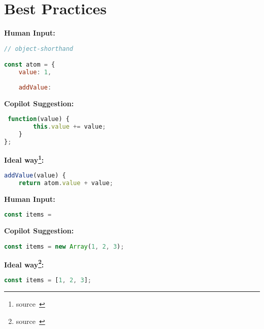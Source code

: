 \section{Best Practices}

\begin{tcolorbox}[title=object-shorthand,boxsep=.5mm]
\textbf{Human Input:}
\begin{lstlisting}[language=JavaScript]
// object-shorthand

const atom = {
	value: 1,
      
	addValue:
\end{lstlisting}
\tcbline
\textbf{Copilot Suggestion:}
\begin{lstlisting}[language=JavaScript, escapechar=\%]
% \noindent\textcolor{gray}{addValue:}%
 function(value) {
		this.value += value;
	}
};
\end{lstlisting}
\tcbline
\textbf{Ideal way\footnote{source~\cite{airbnb_code}}:}
\begin{lstlisting}[language=JavaScript]
addValue(value) {
    return atom.value + value;
\end{lstlisting}
\end{tcolorbox}


\begin{tcolorbox}[title=array creating constructor,boxsep=.5mm]
\textbf{Human Input:}
\begin{lstlisting}[language=JavaScript]
const items = 
\end{lstlisting}
\tcbline
\textbf{Copilot Suggestion:}
\begin{lstlisting}[language=JavaScript, escapechar=\%]
const items = new Array(1, 2, 3);
\end{lstlisting}
\tcbline
\textbf{Ideal way\footnote{source~\cite{airbnb_code}}:}
\begin{lstlisting}[language=JavaScript]
const items = [1, 2, 3];
\end{lstlisting}
\end{tcolorbox}


